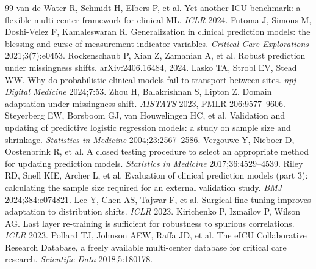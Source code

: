\documentclass[11pt,a4paper]{article}
\begin{document}
\begin{thebibliography}{99}
 van de Water R, Schmidt H, Elbers P, et al. Yet another ICU benchmark: a flexible multi-center framework for clinical ML. \emph{ICLR} 2024.
 Futoma J, Simons M, Doshi-Velez F, Kamaleswaran R. Generalization in clinical prediction models: the blessing and curse of measurement indicator variables. \emph{Critical Care Explorations} 2021;3(7):e0453.
 Rockenschaub P, Xian Z, Zamanian A, et al. Robust prediction under missingness shifts. arXiv:2406.16484, 2024.
 Lasko TA, Strobl EV, Stead WW. Why do probabilistic clinical models fail to transport between sites. \emph{npj Digital Medicine} 2024;7:53.
 Zhou H, Balakrishnan S, Lipton Z. Domain adaptation under missingness shift. \emph{AISTATS} 2023, PMLR 206:9577--9606.
 Steyerberg EW, Borsboom GJ, van Houwelingen HC, et al. Validation and updating of predictive logistic regression models: a study on sample size and shrinkage. \emph{Statistics in Medicine} 2004;23:2567--2586.
 Vergouwe Y, Nieboer D, Oostenbrink R, et al. A closed testing procedure to select an appropriate method for updating prediction models. \emph{Statistics in Medicine} 2017;36:4529--4539.
 Riley RD, Snell KIE, Archer L, et al. Evaluation of clinical prediction models (part 3): calculating the sample size required for an external validation study. \emph{BMJ} 2024;384:e074821.
 Lee Y, Chen AS, Tajwar F, et al. Surgical fine-tuning improves adaptation to distribution shifts. \emph{ICLR} 2023.
 Kirichenko P, Izmailov P, Wilson AG. Last layer re-training is sufficient for robustness to spurious correlations. \emph{ICLR} 2023.
 Pollard TJ, Johnson AEW, Raffa JD, et al. The eICU Collaborative Research Database, a freely available multi-center database for critical care research. \emph{Scientific Data} 2018;5:180178.
\end{thebibliography}
\end{document}
